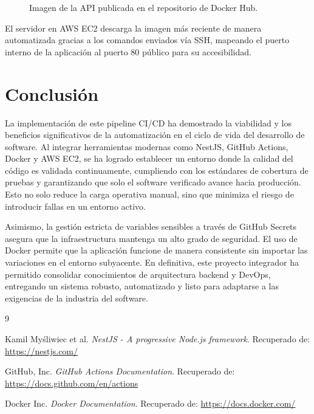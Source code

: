 \documentclass[12pt, letterpaper]{extarticle}
\begin{document}
\begin{figure}[h]
    \centering
    \vspace{5cm} %
    \caption{Imagen de la API publicada en el repositorio de Docker Hub.}
    \label{fig:docker_hub}
\end{figure}

El servidor en AWS EC2 descarga la imagen más reciente de manera automatizada gracias a los comandos enviados vía SSH, mapeando el puerto interno de la aplicación al puerto 80 público para su accesibilidad.

\section{Conclusión}

La implementación de este pipeline CI/CD ha demostrado la viabilidad y los beneficios significativos de la automatización en el ciclo de vida del desarrollo de software. Al integrar herramientas modernas como NestJS, GitHub Actions, Docker y AWS EC2, se ha logrado establecer un entorno donde la calidad del código es validada continuamente, cumpliendo con los estándares de cobertura de pruebas y garantizando que solo el software verificado avance hacia producción. Esto no solo reduce la carga operativa manual, sino que minimiza el riesgo de introducir fallas en un entorno activo.

Asimismo, la gestión estricta de variables sensibles a través de GitHub Secrets asegura que la infraestructura mantenga un alto grado de seguridad. El uso de Docker permite que la aplicación funcione de manera consistente sin importar las variaciones en el entorno subyacente. En definitiva, este proyecto integrador ha permitido consolidar conocimientos de arquitectura backend y DevOps, entregando un sistema robusto, automatizado y listo para adaptarse a las exigencias de la industria del software.

\newpage
\begin{thebibliography}{9}

Kamil Myśliwiec et al. 
\textit{NestJS - A progressive Node.js framework}. 
Recuperado de: \url{https://nestjs.com/}

GitHub, Inc. 
\textit{GitHub Actions Documentation}. 
Recuperado de: \url{https://docs.github.com/en/actions}

Docker Inc. 
\textit{Docker Documentation}. 
Recuperado de: \url{https://docs.docker.com/}

\end{thebibliography}
\end{document}

